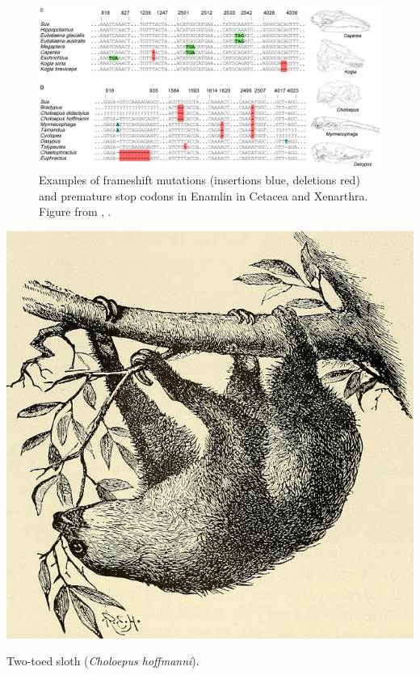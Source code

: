 \begin{figure}
\begin{center}
\includegraphics[width=\textwidth]{Journal_figs/genetic_drift/Enamelin/Enamlin.pdf}
\end{center}
\caption{Examples of frameshift mutations (insertions blue, deletions
  red) and premature stop codons in Enamlin in Cetacea and
  Xenarthra. Figure from \citet{Meredith:09}, \PLOSccBY. } \label{fig:Enamlin_coding}  
\end{figure} 

\begin{marginfigure}
\begin{center}
\includegraphics[width=\textwidth]{illustration_images/Genetic_drift/sloth/20423856040_6e4360df9c_z.jpg}   %
\end{center}
\caption{Two-toed sloth ({\it Choloepus hoffmanni}).  } \label{fig:sloth}  
\end{marginfigure} 

